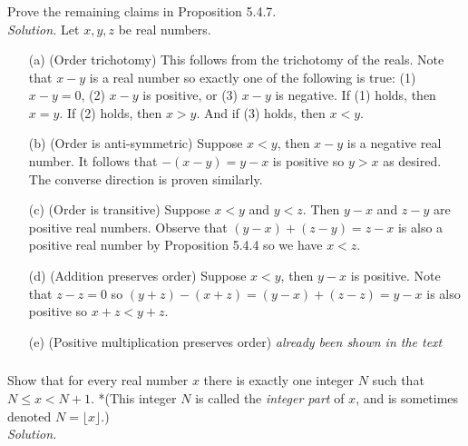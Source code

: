 \documentclass{amsart}
\theoremstyle{definition}
\newcommand{\soln}{\newline\textit{Solution.} }
\begin{document}
\subsubsection{} Prove the remaining claims in Proposition 5.4.7. \\
\soln Let $x,y,z$ be real numbers. 
\begin{enumerate}
\item[(a)] (Order trichotomy) This follows from the trichotomy of the reals. Note that $x-y$ is a real number so exactly one of the following is true: (1) $x-y=0$, (2) $x-y$ is positive, or (3) $x-y$ is negative. If (1) holds, then $x=y$. If (2) holds, then $x>y$. And if (3) holds, then $x<y$. 
\item[(b)] (Order is anti-symmetric) Suppose $x<y$, then $x-y$ is a negative real number. It follows that $-(x-y)=y-x$ is positive so $y>x$ as desired. The converse direction is proven similarly.
\item[(c)] (Order is transitive) Suppose $x<y$ and $y<z$. Then $y-x$ and $z-y$ are positive real numbers. Observe that $(y-x)+(z-y)=z-x$ is also a positive real number by Proposition 5.4.4 so we have $x<z$.
\item[(d)] (Addition preserves order) Suppose $x<y$, then $y-x$ is positive. Note that $z-z=0$ so $(y+z)-(x+z)=(y-x)+(z-z)=y-x$ is also positive so $x+z<y+z$.
\item[(e)] (Positive multiplication preserves order) \textit{already been shown in the text} \\
\end{enumerate}


\subsubsection{} Show that for every real number $x$ there is exactly one integer $N$ such that $N\leq x<N+1$. *(This integer $N$ is called the \textit{integer part} of $x$, and is sometimes denoted $N=\lfloor x\rfloor$.) \\
\soln 
\end{document}
